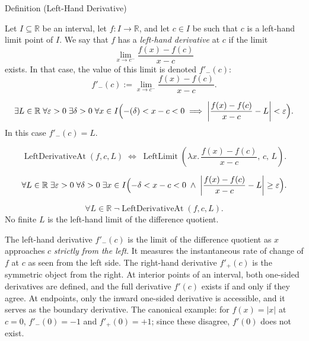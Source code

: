 
\begin{definitionbox}{Definition (Left-Hand Derivative)}
\begin{definition}
\label{def:left-hand-derivative}
Let $I \subseteq \mathbb{R}$ be an interval, let $f : I \to \mathbb{R}$, and let $c \in I$ be such that $c$ is a left-hand limit point of $I$. We say that $f$ has a \emph{left-hand derivative} at $c$ if the limit
\[
\lim_{x \to c^-} \frac{f(x) - f(c)}{x - c}
\]
exists. In that case, the value of this limit is denoted $f'_-(c)$:
\[
f'_-(c) := \lim_{x \to c^-} \frac{f(x) - f(c)}{x - c}.
\]
\end{definition}
\end{definitionbox}

\begin{remark*}
\[
\exists L \in \mathbb{R}\;\forall \varepsilon > 0\;\exists \delta > 0\;\forall x \in I
\Bigl(-({\delta}) < x - c < 0 \implies \left|\frac{f(x)-f(c)}{x-c} - L\right| < \varepsilon\Bigr).
\]
In this case $f'_-(c) = L$.
\end{remark*}

\begin{remark*}
\[
\operatorname{LeftDerivativeAt}(f, c, L)
\;\Longleftrightarrow\;
\operatorname{LeftLimit}\!\left(\lambda x.\,\frac{f(x)-f(c)}{x-c},\, c,\, L\right).
\]
\end{remark*}

\begin{remark*}
\[
\forall L \in \mathbb{R}\;\exists \varepsilon > 0\;\forall \delta > 0\;\exists x \in I
\Bigl(-\delta < x - c < 0 \;\land\; \left|\frac{f(x)-f(c)}{x-c} - L\right| \ge \varepsilon\Bigr).
\]
\end{remark*}

\begin{remark*}
\[
\forall L \in \mathbb{R}\;\lnot\operatorname{LeftDerivativeAt}(f, c, L).
\]
No finite $L$ is the left-hand limit of the difference quotient.
\end{remark*}

\begin{remark*}[Interpretation]
The left-hand derivative $f'_-(c)$ is the limit of the difference quotient as $x$ approaches $c$ \emph{strictly from the left}. It measures the instantaneous rate of change of $f$ at $c$ as seen from the left side. The right-hand derivative $f'_+(c)$ is the symmetric object from the right. At interior points of an interval, both one-sided derivatives are defined, and the full derivative $f'(c)$ exists if and only if they agree. At endpoints, only the inward one-sided derivative is accessible, and it serves as the boundary derivative. The canonical example: for $f(x) = |x|$ at $c = 0$, $f'_-(0) = -1$ and $f'_+(0) = +1$; since these disagree, $f'(0)$ does not exist.
\end{remark*}

